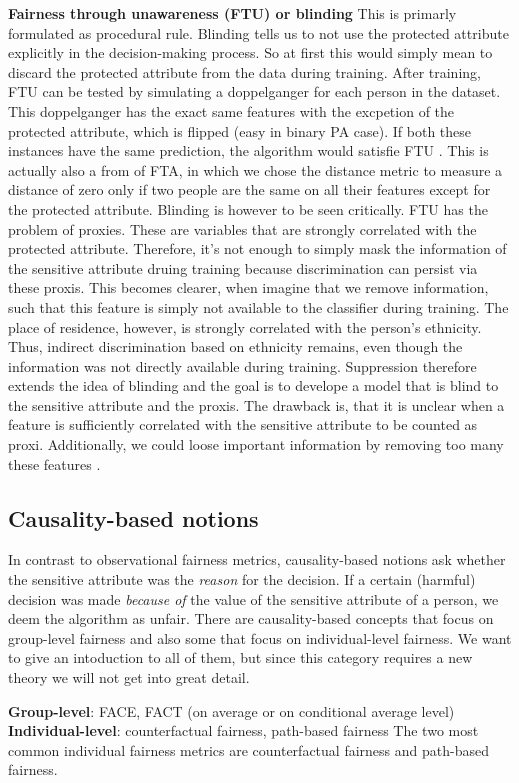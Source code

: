 \textbf{Fairness through unawareness (FTU) or blinding}
This is primarly formulated as procedural rule. Blinding tells us to not use the protected attribute explicitly in the decision-making process. So at first this would simply mean to discard the protected attribute from the data during training. After training, FTU can be tested by simulating a doppelganger for each person in the dataset. This doppelganger has the exact same features with the excpetion of the protected attribute, which is flipped (easy in binary PA case). If both these instances have the same prediction, the algorithm would satisfie FTU \cite{verma2018}. This is actually also a from of FTA, in which we chose the distance metric to measure a distance of zero only if two people are the same on all their features except for the protected attribute. Blinding is however to be seen critically.
FTU has the problem of proxies. These are variables that are strongly correlated with the protected attribute. Therefore, it's not enough to simply mask the information of the sensitive attribute druing training because discrimination can persist via these proxis. This becomes clearer, when imagine that we remove information, such that this feature is simply not available to the classifier during training. The place of residence, however, is strongly correlated with the person's ethnicity. Thus, indirect discrimination based on ethnicity remains, even though the information was not directly available during training. Suppression therefore extends the idea of blinding and the goal is to develope a model that is blind to the sensitive attribute and the proxis. The drawback is, that it is unclear when a feature is sufficiently correlated with the sensitive attribute to be counted as proxi. Additionally, we could loose important information by removing too many these features \cite{castelnovo2022}.

\subsection*{Causality-based notions}
In contrast to observational fairness metrics, causality-based notions ask whether the sensitive attribute was the \textit{reason} for the decision. If a certain (harmful) decision was made \textit{because of} the value of the sensitive attribute of a person, we deem the algorithm as unfair.
There are causality-based concepts that focus on group-level fairness and also some that focus on individual-level fairness. We want to give an intoduction to all of them, but since this category requires a new theory we will not get into great detail.

\textbf{Group-level}: FACE, FACT (on average or on conditional average level) \parencite{Zafar2017PPNFC}\\
\textbf{Individual-level}: counterfactual fairness, path-based fairness \parencite{kusner} 
The two most common individual fairness metrics are counterfactual fairness and path-based fairness.




